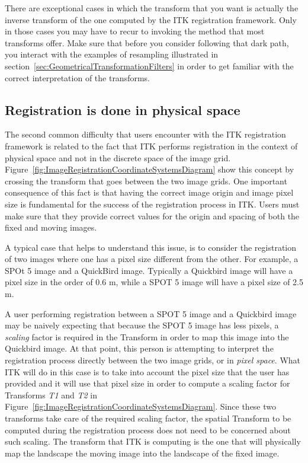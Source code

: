 There are exceptional cases in which the transform that you want is actually
the inverse transform of the one computed by the ITK registration framework.
Only in those cases you may have to recur to invoking the 
method that most transforms offer. Make sure that before you consider following
that dark path, you interact with the examples of resampling illustrated in
section~\ref{sec:GeometricalTransformationFilters} in order to get familiar
with the correct interpretation of the transforms.


\subsection{Registration is done in physical space}
\label{sec:RegistrationIsDoneInPhysicalSpace}

The second common difficulty that users encounter with the ITK registration
framework is related to the fact that ITK performs registration in the context
of physical space and not in the discrete space of the image grid.
Figure~\ref{fig:ImageRegistrationCoordinateSystemsDiagram} show this concept by
crossing the transform that goes between the two image grids. One important
consequence of this fact is that having the correct image origin and image
pixel size is fundamental for the success of the registration process in ITK.
Users must make sure that they provide correct values for the origin and
spacing of both the fixed and moving images.

A typical case that helps to understand this issue, is to consider the
registration of two images where one has a pixel size different from the other.
For example, a SPOt 5 image and a
QuickBird image. Typically a Quickbird image will
have a pixel size in the order of 0.6 m, while a SPOT 5 image will have a
pixel size of 2.5 m.

A user performing registration between a SPOT 5 image and a Quickbird image may be
naively expecting that because the SPOT 5 image has less pixels, a {\em scaling}
factor is required in the Transform in order to map this image into the Quickbird
image. At that point, this person is attempting to interpret the registration
process directly between the two image grids, or in {\em pixel space}. What ITK
will do in this case is to take into account the pixel size that the user has
provided and it will use that pixel size in order to compute a scaling factor
for Transforms {\em T1} and {\em T2} in
Figure~\ref{fig:ImageRegistrationCoordinateSystemsDiagram}. Since these two
transforms take care of the required scaling factor, the spatial Transform to
be computed during the registration process does not need to be concerned about
such scaling. The transform that ITK is computing is the one that will
physically map the landscape the moving image into the landscape of the fixed
image.

